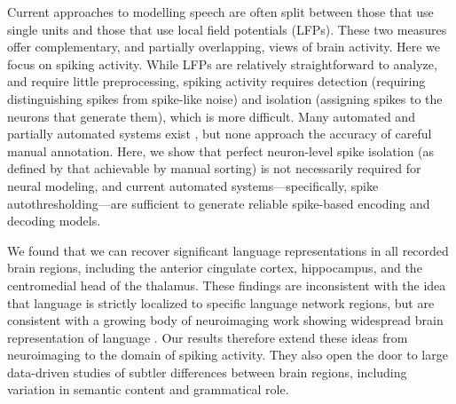 \documentclass[pdflatex,sn-basic]{sn-jnl}%
\theoremstyle{thmstyleone}%
\theoremstyle{thmstyletwo}%
\theoremstyle{thmstylethree}%
\begin{document}
Current approaches to modelling speech are often split between those that use single units and those that use local field potentials (LFPs). These two measures offer complementary, and partially overlapping, views of brain activity. Here we focus on spiking activity. While LFPs are relatively straightforward to analyze, and require little preprocessing, spiking activity requires detection (requiring distinguishing spikes from spike-like noise) and isolation (assigning spikes to the neurons that generate them), which is more difficult. Many automated and partially automated systems exist \citep{bib87,bib128,bib108,bib130}, but none approach the accuracy of careful manual annotation. Here, we show that perfect neuron-level spike isolation (as defined by that achievable by manual sorting) is not necessarily required for neural modeling, and current automated systems---specifically, spike autothresholding---are sufficient to generate reliable spike-based encoding and decoding models.

We found that we can recover significant language representations in all recorded brain regions, including the anterior cingulate cortex, hippocampus, and the centromedial head of the thalamus. These findings are inconsistent with the idea that language is strictly localized to specific language network regions, but are consistent with a growing body of neuroimaging work showing widespread brain representation of language \citep{bib2,bib8,bib140,bib139,bib3,bib138}. Our results therefore extend these ideas from neuroimaging to the domain of spiking activity. They also open the door to large data-driven studies of subtler differences between brain regions, including variation in semantic content and grammatical role.
\end{document}
